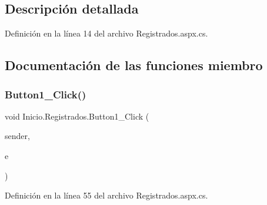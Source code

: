\subsection{Descripción detallada}


Definición en la línea 14 del archivo Registrados.\+aspx.\+cs.



\subsection{Documentación de las funciones miembro}
\mbox{\label{classInicio_1_1Registrados_a3f8a14965116a309bdfe026bf3d6d743}} 
\subsubsection{\texorpdfstring{Button1\_Click()}{Button1\_Click()}}
{\footnotesize\ttfamily void Inicio.\+Registrados.\+Button1\+\_\+\+Click (\begin{DoxyParamCaption}\item[{object}]{sender,  }\item[{Event\+Args}]{e }\end{DoxyParamCaption})\hspace{0.3cm}{\ttfamily [protected]}}



Definición en la línea 55 del archivo Registrados.\+aspx.\+cs.


